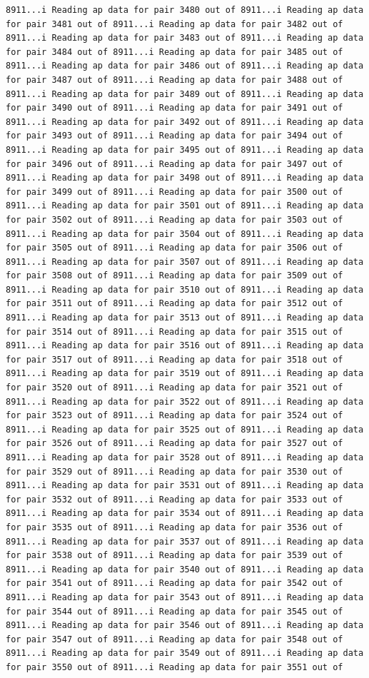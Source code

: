 \documentclass[
]{article}
\begin{document}
\begin{verbatim}
8911...i Reading ap data for pair 3480 out of 8911...i Reading ap data for pair 3481 out of 8911...i Reading ap data for pair 3482 out of 8911...i Reading ap data for pair 3483 out of 8911...i Reading ap data for pair 3484 out of 8911...i Reading ap data for pair 3485 out of 8911...i Reading ap data for pair 3486 out of 8911...i Reading ap data for pair 3487 out of 8911...i Reading ap data for pair 3488 out of 8911...i Reading ap data for pair 3489 out of 8911...i Reading ap data for pair 3490 out of 8911...i Reading ap data for pair 3491 out of 8911...i Reading ap data for pair 3492 out of 8911...i Reading ap data for pair 3493 out of 8911...i Reading ap data for pair 3494 out of 8911...i Reading ap data for pair 3495 out of 8911...i Reading ap data for pair 3496 out of 8911...i Reading ap data for pair 3497 out of 8911...i Reading ap data for pair 3498 out of 8911...i Reading ap data for pair 3499 out of 8911...i Reading ap data for pair 3500 out of 8911...i Reading ap data for pair 3501 out of 8911...i Reading ap data for pair 3502 out of 8911...i Reading ap data for pair 3503 out of 8911...i Reading ap data for pair 3504 out of 8911...i Reading ap data for pair 3505 out of 8911...i Reading ap data for pair 3506 out of 8911...i Reading ap data for pair 3507 out of 8911...i Reading ap data for pair 3508 out of 8911...i Reading ap data for pair 3509 out of 8911...i Reading ap data for pair 3510 out of 8911...i Reading ap data for pair 3511 out of 8911...i Reading ap data for pair 3512 out of 8911...i Reading ap data for pair 3513 out of 8911...i Reading ap data for pair 3514 out of 8911...i Reading ap data for pair 3515 out of 8911...i Reading ap data for pair 3516 out of 8911...i Reading ap data for pair 3517 out of 8911...i Reading ap data for pair 3518 out of 8911...i Reading ap data for pair 3519 out of 8911...i Reading ap data for pair 3520 out of 8911...i Reading ap data for pair 3521 out of 8911...i Reading ap data for pair 3522 out of 8911...i Reading ap data for pair 3523 out of 8911...i Reading ap data for pair 3524 out of 8911...i Reading ap data for pair 3525 out of 8911...i Reading ap data for pair 3526 out of 8911...i Reading ap data for pair 3527 out of 8911...i Reading ap data for pair 3528 out of 8911...i Reading ap data for pair 3529 out of 8911...i Reading ap data for pair 3530 out of 8911...i Reading ap data for pair 3531 out of 8911...i Reading ap data for pair 3532 out of 8911...i Reading ap data for pair 3533 out of 8911...i Reading ap data for pair 3534 out of 8911...i Reading ap data for pair 3535 out of 8911...i Reading ap data for pair 3536 out of 8911...i Reading ap data for pair 3537 out of 8911...i Reading ap data for pair 3538 out of 8911...i Reading ap data for pair 3539 out of 8911...i Reading ap data for pair 3540 out of 8911...i Reading ap data for pair 3541 out of 8911...i Reading ap data for pair 3542 out of 8911...i Reading ap data for pair 3543 out of 8911...i Reading ap data for pair 3544 out of 8911...i Reading ap data for pair 3545 out of 8911...i Reading ap data for pair 3546 out of 8911...i Reading ap data for pair 3547 out of 8911...i Reading ap data for pair 3548 out of 8911...i Reading ap data for pair 3549 out of 8911...i Reading ap data for pair 3550 out of 8911...i Reading ap data for pair 3551 out of 
\end{verbatim}
\end{document}
